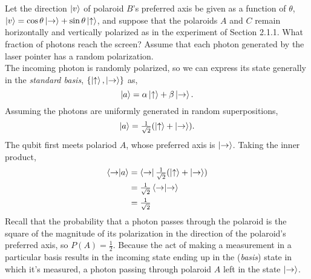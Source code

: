 \section{}

Let the direction $\ket{v}$ of polaroid $B$'s preferred axis be given as a function of $\theta$,
$\ket{v} = \cos \theta \ket{\rightarrow} + \sin \theta \ket{\uparrow}$, and suppose that the polaroids
$A$ and $C$ remain horizontally and vertically polarized as in the experiment of Section 2.1.1.
What fraction of photons reach the screen?
Assume that each photon generated by the laser pointer has a random polarization. \\

{\Sol}
\label{sol:2p1}
The incoming photon is randomly polarized, so we can express its state generally in the \textit{standard basis},
$\{\ket{\uparrow}, \ket{\rightarrow}\}$ as,
\begin{equation}
    \ket{a} = \alpha \ket{\uparrow} + \beta \ket{\rightarrow}.
\end{equation}
Assuming the photons are uniformly generated in random superpositions,
\begin{equation}
    \ket{a} = \tfrac{1}{\sqrt{2}} (\ket{\uparrow} + \ket{\rightarrow}).
\end{equation}
The qubit first meets polariod $A$, whose preferred axis is $\ket{\rightarrow}$.
Taking the inner product,
\begin{align}
    \bra{\rightarrow}\ket{a} &= \bra{\rightarrow} \tfrac{1}{\sqrt{2}} (\ket{\uparrow} + \ket{\rightarrow}) \nonumber \\
        &= \tfrac{1}{\sqrt{2}} \braket{\rightarrow} \nonumber \\
        &= \tfrac{1}{\sqrt{2}} \nonumber
\end{align}
Recall that the probability that a photon passes through the polaroid is the square of the magnitude
of its polarization in the direction of the polaroid's preferred axis, so $P(A) = \tfrac{1}{2}$.
Because the act of making a measurement in a particular basis results in the incoming state ending
up in the (\textit{basis}) state in which it's measured, a photon passing through polaroid $A$ left in the state
$\ket{\rightarrow}$.

